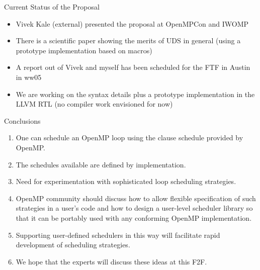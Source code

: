 \begin{frame}{Current Status of the Proposal}{}
\begin{itemize}
\item Vivek Kale (external) presented the proposal at OpenMPCon and IWOMP
\item There is a scientific paper showing the merits of UDS in general (using a prototype implementation based on macros)
\item A report out of Vivek and myself has been scheduled for the FTF in Austin in ww05
\item We are working on the syntax details plus a prototype implementation in the LLVM RTL (no compiler work envisioned for now)
\end{itemize}
\end{frame}



\begin{frame}[label=udsconclusions]{Conclusions} 
\begin{enumerate}
\item One can schedule an OpenMP loop using the clause schedule provided by OpenMP. 
\item The schedules available are defined by implementation.
\item Need for experimentation with sophisticated loop scheduling strategies.
\item OpenMP community should discuss how to allow flexible specification of such strategies in a user’s code and how to design a user-level scheduler library so that it can be portably used with any conforming OpenMP implementation.
\item Supporting user-defined schedulers in this way will facilitate rapid development of scheduling strategies.
\item We hope that the experts will discuss these ideas at this F2F.
\end{enumerate}
\end{frame}
